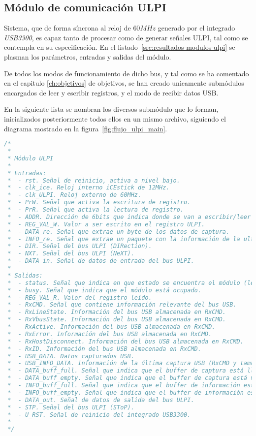 \subsection{Módulo de comunicación ULPI}
Sistema, que de forma síncrona al reloj de $60MHz$ generado por el integrado \emph{USB3300}, es capaz tanto de procesar como de generar señales ULPI, tal como se contempla en su especificación\cite{ulpi-specs}. En el listado~\ref{src:resultados-modulos-ulpi} se plasman los parámetros, entradas y salidas del módulo.

De todos los modos de funcionamiento de dicho bus, y tal como se ha comentado en el capitulo \ref{ch:objetivos} de objetivos, se han creado unicamente submódulos encargados de leer y escribir registros, y el modo de recibir datos USB.

En la siguiente lista se nombran los diversos submódulo que lo forman, inicializados posteriormente todos ellos en un mismo archivo, siguiendo el diagrama mostrado en la figura~\ref{fig:flujo_ulpi_main}.

\begin{lstlisting}[language=Verilog,
    caption={Entradas y salidas del módulo ULPI.},
    label=src:resultados-modulos-ulpi]
/*
 *
 * Módulo ULPI
 *
 * Entradas:
 *  - rst. Señal de reinicio, activa a nivel bajo.
 *  - clk_ice. Reloj interno iCEstick de 12MHz.
 *  - clk_ULPI. Reloj externo de 60MHz.
 *  - PrW. Señal que activa la escritura de registro.
 *  - PrR. Señal que activa la lectura de registro.
 *  - ADDR. Dirección de 6bits que indica donde se van a escribir/leer los datos.
 *  - REG_VAL_W. Valor a ser escrito en el registro ULPI.
 *  - DATA_re. Señal que extrae un byte de los datos de captura.
 *  - INFO_re. Señal que extrae un paquete con la información de la ultima captura.
 *  - DIR. Señal del bus ULPI (DIRection).
 *  - NXT. Señal del bus ULPI (NeXT).
 *  - DATA_in. Señal de datos de entrada del bus ULPI.
 *
 * Salidas:
 *  - status. Señal que indica en que estado se encuentra el módulo (lectura, escritura, etc..)
 *  - busy. Señal que indica que el módulo está ocupado.
 *  - REG_VAL_R. Valor del registro leído.
 *  - RxCMD. Señal que contiene información relevante del bus USB.
 *  - RxLineState. Información del bus USB almacenada en RxCMD.
 *  - RxVbusState. Información del bus USB almacenada en RxCMD.
 *  - RxActive. Información del bus USB almacenada en RxCMD.
 *  - RxError. Información del bus USB almacenada en RxCMD.
 *  - RxHostDisconnect. Información del bus USB almacenada en RxCMD.
 *  - RxID. Información del bus USB almacenada en RxCMD.
 *  - USB_DATA. Datos capturados USB.
 *  - USB_INFO_DATA. Información de la última captura USB (RxCMD y tamaño).
 *  - DATA_buff_full. Señal que indica que el buffer de captura está lleno.
 *  - DATA_buff_empty. Señal que indica que el buffer de captura está vacio.
 *  - INFO_buff_full. Señal que indica que el buffer de información está lleno.
 *  - INFO_buff_empty. Señal que indica que el buffer de información está vacio.
 *  - DATA_out. Señal de datos de salida del bus ULPI.
 *  - STP. Señal del bus ULPI (SToP).
 *  - U_RST. Señal de reinicio del integrado USB3300.
 *
 */
\end{lstlisting}

